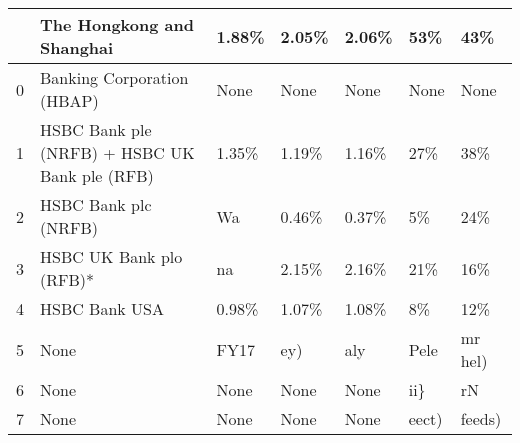 \begin{tabular}{lllllll}
\toprule
{} &                      The Hongkong and Shanghai &  1.88\% &  2.05\% &  2.06\% &    53\% &      43\% \\
\midrule
0 &                     Banking Corporation (HBAP) &   None &   None &   None &   None &     None \\
1 &  HSBC Bank ple (NRFB) + HSBC UK Bank ple (RFB) &  1.35\% &  1.19\% &  1.16\% &    27\% &      38\% \\
2 &                           HSBC Bank plc (NRFB) &     Wa &  0.46\% &  0.37\% &     5\% &      24\% \\
3 &                        HSBC UK Bank plo (RFB)* &     na &  2.15\% &  2.16\% &    21\% &      16\% \\
4 &                                  HSBC Bank USA &  0.98\% &  1.07\% &  1.08\% &     8\% &      12\% \\
5 &                                           None &   FY17 &    ey) &    aly &   Pele &  mr hel) \\
6 &                                           None &   None &   None &   None &    ii\} &       rN \\
7 &                                           None &   None &   None &   None &  eect) &   feeds) \\
\bottomrule
\end{tabular}
